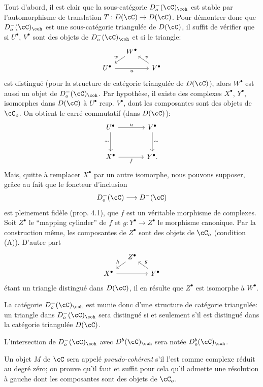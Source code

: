 Tout d'abord, il est clair que la sous-catégorie $D_o^-(\cC)_{\coh}$ est stable par l'automorphisme de translation $T:D(\cC)\to D(\cC)$. Pour démontrer donc que $D_o^-(\cC)_{\coh}$ est une sous-catégorie triangulée de $D(\cC)$, il suffit de vérifier que si $U^\bullet$, $V^\bullet$ sont des objets de $D_o^-(\cC)_{\coh}$ et si le triangle:
\[
\begin{tikzcd}[column sep=small,row sep=small]
& W^\bullet \arrow[dl,"w"']\\
U^\bullet \arrow[rr,"u"']&& V^\bullet \arrow[ul,"v"']
\end{tikzcd}
\]
est distingué (pour la structure de catégorie triangulée de $D(\cC)$), alors $W^\bullet$ est aussi un objet de $D_o^-(\cC)_{\coh}$. Par hypothèse, il existe des complexes $X^\bullet$, $Y^\bullet$, isomorphes dans $D(\cC)$ à $U^\bullet$ resp. $V^\bullet$, dont les composantes sont des objets de $\cC_o$. On obtient le carré
commutatif (dans $D(\cC)$):
\[
\begin{tikzcd}[column sep=large,row sep=large]
U^\bullet \arrow[r,"u"] \arrow[d,"\sim"']&V^\bullet \arrow[d,"\sim"]\\
X^\bullet \arrow[r,"f"']&Y^\bullet .
\end{tikzcd}
\]
Mais, quitte à remplacer $X^\bullet$ par un autre isomorphe, nous pouvons supposer, grâce au fait que le foncteur d'inclusion
\[
D_o^-(\cC)\longrightarrow D^-(\cC)
\]
est pleinement fidèle (prop. 4.1), que $f$ est un véritable morphisme de complexes. Soit $Z^\bullet$ le ``mapping cylinder'' de $f$ et $g:Y^\bullet\to Z^\bullet$ le morphisme canonique. Par la construction même, les composantes de $Z^\bullet$ sont des objets de $\cC_o$ (condition (A)). D'autre part
\[
\begin{tikzcd}[column sep=small,row sep=small]
&Z^\bullet \arrow[dl,"h"']\\
X^\bullet \arrow[rr]&&Y^\bullet \arrow[ul,"g"']
\end{tikzcd}
\]
étant un triangle distingué dans $D(\cC)$, il en résulte que $Z^\bullet$ est isomorphe à $W^\bullet$.

La catégorie $D_o^-(\cC)_{\coh}$ est munie donc d'une structure de catégorie triangulée: un triangle dans $D_o^-(\cC)_{\coh}$ sera distingué si et seulement s'il est distingué dans la catégorie triangulée $D(\cC)$.

L'intersection de $D_o^-(\cC)_{\coh}$ avec $D^b(\cC)_{\coh}$ sera notée $D_o^b(\cC)_{\coh}$.

Un objet $M$ de $\cC$ sera appelé \emph{pseudo-cohérent} s'il l'est comme complexe réduit au degré zéro; on prouve qu'il faut et suffit 
pour
cela qu'il admette une résolution à gauche dont les composantes sont des objets de $\cC_o$.

